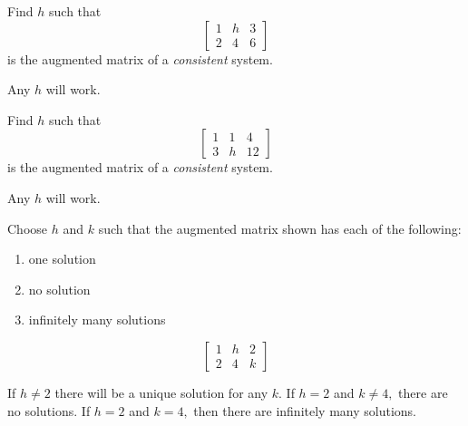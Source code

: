 \documentclass{ximera}
\begin{document}
\begin{problem}\label{prb:2.11}
Find $h$ such that
\begin{equation*}
\left[
\begin{array}{rr|r}
1 & h & 3 \\
2 & 4 & 6
\end{array}
\right]
\end{equation*}
is the augmented matrix of a \textit{consistent} system.
\begin{hint}
 Any $h$ will work.
\end{hint}
\end{problem}

\begin{problem}\label{prb:2.12}
Find $h$ such that
\begin{equation*}
\left[
\begin{array}{rr|r}
1 & 1 & 4 \\
3 & h & 12
\end{array}
\right]
\end{equation*}
is the augmented matrix of a \textit{consistent} system.
\begin{hint}
 Any $h$ will work.
\end{hint}
\end{problem}


\begin{problem}\label{prb:2.13}
Choose $h$ and $k$ such that the augmented matrix shown has each of the following:
\begin{enumerate}
\item one solution
\item no solution
\item infinitely many solutions
\end{enumerate}
\begin{equation*}
\left[
\begin{array}{rr|r}
1 & h & 2 \\
2 & 4 & k
\end{array}
\right]
\end{equation*}
\begin{hint}
If $h\neq 2$ there will be a unique solution for any $k$. If $h=2$ and $%
k\neq 4,$ there are no solutions. If $h=2$ and $k=4,$ then there are
infinitely many solutions.
\end{hint}
\end{problem}
\end{document}
